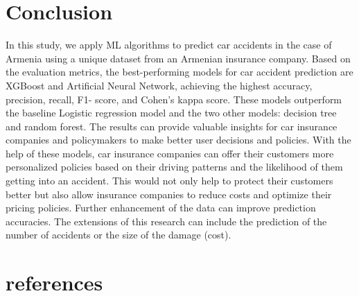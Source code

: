 \documentclass{IEEEtran}
\begin{document}
\section{Conclusion }

In this study, we apply ML algorithms to predict car accidents in the case of Armenia using a unique dataset from an Armenian insurance company. Based on the evaluation metrics, the best-performing models for car accident prediction are XGBoost and Artificial Neural Network, achieving the highest accuracy, precision, recall, F1- score, and Cohen’s kappa score. These models outperform the baseline Logistic regression model and the two other models: decision tree and random forest. The results can provide valuable insights for car insurance companies and policymakers to make better user decisions and policies. With the help of these models, car insurance companies can offer their customers more personalized policies based on their driving patterns and the likelihood of them getting into an accident. This would not only help to protect their customers better but also allow insurance companies to reduce costs and optimize their pricing policies. Further enhancement of the data can improve prediction accuracies. The extensions of this research can include the prediction of the number of accidents or the size of the damage (cost).







\section{references }
\end{document}
